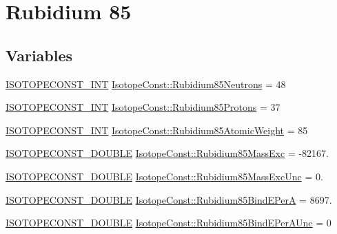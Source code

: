 \hypertarget{group___isotope_const-_rubidium-_rb85}{}\section{Rubidium 85}
\label{group___isotope_const-_rubidium-_rb85}
\subsection*{Variables}
\begin{DoxyCompactItemize}
\item 
\mbox{\hyperlink{group___isotope_const-_macros_ga5f18360b3e99483a35c32d789e62621c}{I\+S\+O\+T\+O\+P\+E\+C\+O\+N\+S\+T\+\_\+\+I\+NT}} \mbox{\hyperlink{group___isotope_const-_rubidium-_rb85_ga424b3742966772689ddf0d27aa4d0a03}{Isotope\+Const\+::\+Rubidium85\+Neutrons}} = 48
\item 
\mbox{\hyperlink{group___isotope_const-_macros_ga5f18360b3e99483a35c32d789e62621c}{I\+S\+O\+T\+O\+P\+E\+C\+O\+N\+S\+T\+\_\+\+I\+NT}} \mbox{\hyperlink{group___isotope_const-_rubidium-_rb85_gacc34e99b2ffd05e841d0563c74ce704f}{Isotope\+Const\+::\+Rubidium85\+Protons}} = 37
\item 
\mbox{\hyperlink{group___isotope_const-_macros_ga5f18360b3e99483a35c32d789e62621c}{I\+S\+O\+T\+O\+P\+E\+C\+O\+N\+S\+T\+\_\+\+I\+NT}} \mbox{\hyperlink{group___isotope_const-_rubidium-_rb85_gafc86c4a3cf4a48e297f7618b63195b36}{Isotope\+Const\+::\+Rubidium85\+Atomic\+Weight}} = 85
\item 
\mbox{\hyperlink{group___isotope_const-_macros_ga8f45a7272ce02c0b4c65c44636ed719a}{I\+S\+O\+T\+O\+P\+E\+C\+O\+N\+S\+T\+\_\+\+D\+O\+U\+B\+LE}} \mbox{\hyperlink{group___isotope_const-_rubidium-_rb85_ga67a01dd49caedecff816ae7b57601568}{Isotope\+Const\+::\+Rubidium85\+Mass\+Exc}} = -\/82167.
\item 
\mbox{\hyperlink{group___isotope_const-_macros_ga8f45a7272ce02c0b4c65c44636ed719a}{I\+S\+O\+T\+O\+P\+E\+C\+O\+N\+S\+T\+\_\+\+D\+O\+U\+B\+LE}} \mbox{\hyperlink{group___isotope_const-_rubidium-_rb85_gadcb0613d1b5da374f15b3e35b2056720}{Isotope\+Const\+::\+Rubidium85\+Mass\+Exc\+Unc}} = 0.
\item 
\mbox{\hyperlink{group___isotope_const-_macros_ga8f45a7272ce02c0b4c65c44636ed719a}{I\+S\+O\+T\+O\+P\+E\+C\+O\+N\+S\+T\+\_\+\+D\+O\+U\+B\+LE}} \mbox{\hyperlink{group___isotope_const-_rubidium-_rb85_ga2b3409cc71e007de3b74033e707a54ed}{Isotope\+Const\+::\+Rubidium85\+Bind\+E\+PerA}} = 8697.
\item 
\mbox{\hyperlink{group___isotope_const-_macros_ga8f45a7272ce02c0b4c65c44636ed719a}{I\+S\+O\+T\+O\+P\+E\+C\+O\+N\+S\+T\+\_\+\+D\+O\+U\+B\+LE}} \mbox{\hyperlink{group___isotope_const-_rubidium-_rb85_ga7f20a053372453bd9c0b718d6850e881}{Isotope\+Const\+::\+Rubidium85\+Bind\+E\+Per\+A\+Unc}} = 0

\end{DoxyCompactItemize}
